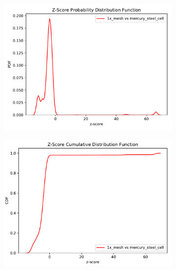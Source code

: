 \begin{figure}
	\begin{subfigure}[t]{0.5\textwidth}
		\includegraphics[width=\linewidth, trim={0cm 0cm 0cm 0.9cm},clip]{../figs/toy_p2/PDF_zscore_VPII_1x_orig.pdf}
		\label{fig:2pdf_1x_orig}
	\end{subfigure}\hfill
	\begin{subfigure}[t]{0.5\textwidth}
		\includegraphics[width=\linewidth, trim={0cm 0cm 0cm 0.8cm},clip]{../figs/toy_p2/CDF_zscore_VPII_1x_orig.pdf}
		\label{fig:2cdf_1x_orig}
	\end{subfigure}


\end{figure}
